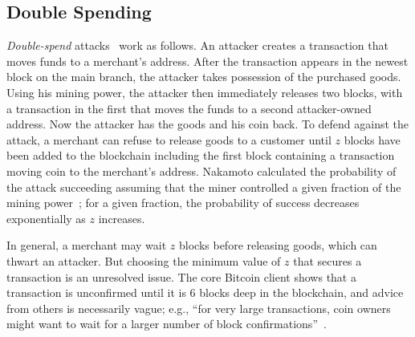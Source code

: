 \subsection{Double Spending} 
{\em Double-spend} attacks~\cite{Nakamoto:2009} work as follows. An attacker creates a transaction that moves
funds to a merchant's address. After the transaction appears in the
newest block on the main branch, the attacker takes possession of the purchased
goods. Using his mining power, the attacker then immediately releases
two blocks, with a transaction in the first that moves the funds to a
second attacker-owned address. Now the attacker has the goods and his
coin back. To defend against the attack, a merchant can refuse to
release goods to a customer until $z$ blocks have been
added to the blockchain including the first block containing a
transaction moving coin to the merchant's address.  Nakamoto
calculated the probability of the attack succeeding assuming that the
miner controlled a given fraction of the mining power~\cite{Nakamoto:2009};
for a given fraction, the probability of success decreases exponentially as $z$
increases. 

In general, a merchant may wait $z$ blocks before releasing goods,
which can thwart an attacker.
But choosing the minimum value of $z$ that secures a transaction is an
unresolved issue. The core Bitcoin client shows that a transaction is
unconfirmed until it is 6 blocks deep in the
blockchain\cite{bitcoin:confirmation}, and   advice from others is necessarily vague; e.g., ``for very large transactions, coin
owners might want to wait for a larger number of block
confirmations''~\cite{Bonneau:2015a}.   


